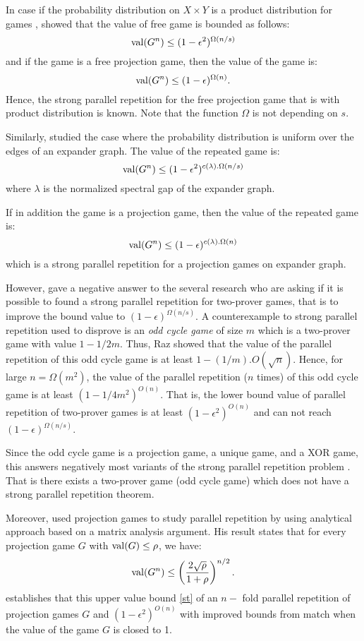 In case if the probability distribution on $X \times Y$ is a product distribution  for games , \cite{barak2009strong}  showed that the value of free game is bounded  as follows:
 $$\mathrm{val} (G^n) \leq (1-\epsilon^2)^{\Omega(n/s)}$$
 and if the game is a free projection game, then the value of the game is: $$\mathrm{val} (G^n) \leq (1-\epsilon)^{\Omega(n)}.$$
Hence, the strong parallel repetition for the free projection game that is with product distribution is known. Note that the function $\Omega$ is not depending on $s.$

Similarly, \cite{raz2012strong} studied the case where the probability distribution is uniform over the edges of an expander graph. The value of the repeated game is:
$$\mathrm{val} (G^n) \leq (1-\epsilon^2)^{c(\lambda). \Omega(n/s)}$$ where $\lambda$ is the normalized spectral gap of the expander  graph. 

If in addition the game is a projection game, then the value of the repeated game is: $$\mathrm{val} (G^n) \leq (1-\epsilon)^{c(\lambda). \Omega(n)}$$ which is  a strong parallel repetition for a projection games on expander graph.

However, \cite{raz2011counterexample} gave a negative answer to the several research who are asking if it is possible to found a strong parallel repetition for two-prover games, that is to improve the bound value to  $(1-\epsilon)^{\Omega(n/s)}.$ A counterexample to strong parallel repetition used to disprove is an \textit{odd cycle game} of size $m$ which is a two-prover game with value $1-1/2m.$ Thus, Raz showed that
the value of the parallel repetition of this odd cycle game is at least $1-(1/m).O(\sqrt{n})$. Hence, for large $n = \Omega(m^2)$, the value of  the parallel repetition ($n$ times) of this odd cycle game is at least $(1-1/4m^2)^{O(n)}$.
That is, the lower bound value of parallel repetition of two-prover games is at least $(1-\epsilon^2)^{O(n)}$ and can not reach $(1-\epsilon)^{\Omega(n/s)}.$

Since the odd cycle game is a projection game, a unique game, and a XOR game, this answers negatively most
variants of the strong parallel repetition problem \citep{raz2011counterexample, raz2012strong}. That is there exists a two-prover game (odd cycle game) which does not have a strong parallel repetition theorem. 

Moreover, \cite{dinur2014analytical} used projection games to study parallel repetition by using analytical approach based on a matrix analysis argument. His
result states that for every projection game $G$ with $\mathrm{val} (G) \leq \rho$, we have:  \begin{align}
\mathrm{val} (G^n) \leq \left(\frac{2\sqrt{\rho}}{1+\rho} \right)^{n/2}. \label{st}
\end{align}
\cite{dinur2014analytical} establishes that this upper value  bound \eqref{st} of an $n-$ fold parallel repetition of projection games $G$ and  $(1-\epsilon^2)^{O(n)}$  
with improved bounds from  \cite{rao2011parallel} match when the value of the game $G$ is closed to 1.

